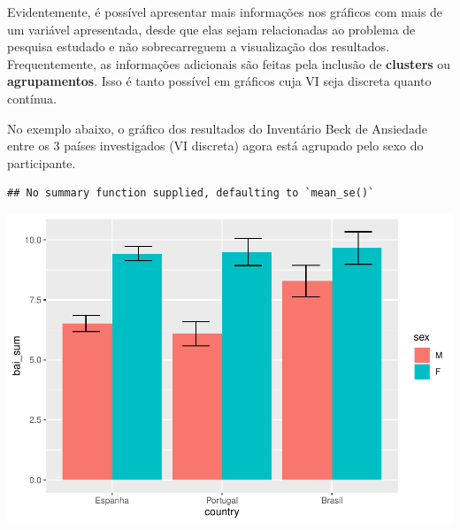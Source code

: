 \documentclass[
]{book}
\newenvironment{Shaded}{\begin{snugshade}}{\end{snugshade}}
\newcommand{\DataTypeTok}[1]{\textcolor[rgb]{0.13,0.29,0.53}{#1}}
\newcommand{\FloatTok}[1]{\textcolor[rgb]{0.00,0.00,0.81}{#1}}
\newcommand{\KeywordTok}[1]{\textcolor[rgb]{0.13,0.29,0.53}{\textbf{#1}}}
\newcommand{\NormalTok}[1]{#1}
\newcommand{\OperatorTok}[1]{\textcolor[rgb]{0.81,0.36,0.00}{\textbf{#1}}}
\newcommand{\StringTok}[1]{\textcolor[rgb]{0.31,0.60,0.02}{#1}}
\begin{document}
Evidentemente, é possível apresentar mais informações nos gráficos com mais de um variável apresentada, desde que elas sejam relacionadas ao problema de pesquisa estudado e não sobrecarreguem a visualização dos resultados. Frequentemente, as informações adicionais são feitas pela inclusão de \textbf{clusters} ou \textbf{agrupamentos}. Isso é tanto possível em gráficos cuja VI seja discreta quanto contínua.

No exemplo abaixo, o gráfico dos resultados do Inventário Beck de Ansiedade entre os 3 países investigados (VI discreta) agora está agrupado pelo sexo do participante.

\begin{Shaded}
\end{Shaded}

\begin{verbatim}
## No summary function supplied, defaulting to `mean_se()`
\end{verbatim}

\begin{center}\includegraphics{gitbook-demo_files/figure-latex/unnamed-chunk-25-1} \end{center}
\end{document}
